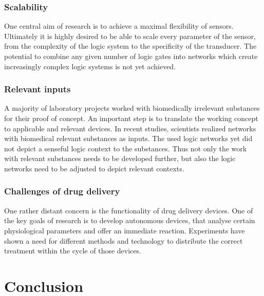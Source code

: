 \documentclass[runningheads]{llncs}
\begin{document}
\subsubsection{Scalability}	One central aim of research is to achieve a maximal flexibility of sensors. Ultimately it is highly desired to be able to scale every parameter of the sensor, from the complexity of the logic system to the specificity of the transducer. The potential to combine any given number of logic gates into networks which create increasingly complex logic systems is not yet achieved.

\subsubsection{Relevant inputs}	A majority of laboratory projects worked with biomedically irrelevant substances for their proof of concept. An important step is to translate the working concept to applicable and relevant devices. In recent studies, scientists realized networks with biomedical relevant substances as inputs. The used logic networks yet did not depict a senseful logic context to the substances. Thus not only the work with relevant substances needs to be developed further, but also the logic networks need to be adjusted to depict relevant contexts.

\subsubsection{Challenges of drug delivery}	One rather distant concern is the functionality of drug delivery devices. One of the key goals of research is to develop autonomous devices, that analyse certain physiological parameters and offer an immediate reaction. Experiments have shown a need for different methods and technology to distribute the correct treatment within the cycle of those devices.


\section{Conclusion}
\end{document}
